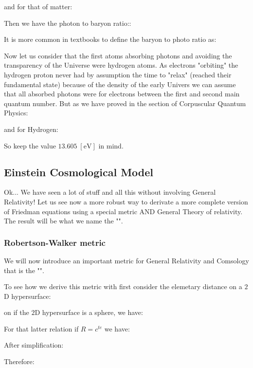 	and for that of matter:
	
	Then we have the photon to baryon ratio::
	
	\begin{tcolorbox}[title=Remark,colframe=black,arc=10pt]
	It is more common in textbooks to define the baryon to photo ratio as:
	
	\end{tcolorbox}
	Now let us consider that the first atoms absorbing photons and avoiding the transparency of the Universe were hydrogen atoms. As electrons "orbiting" the hydrogen proton never had by assumption the time to "relax" (reached their fundamental state) because of the density of the early Univers we can assume that all absorbed photons were for electrons between the first and second main quantum number. But as we have proved in the section of Corpuscular Quantum Physics:
	
	and for Hydrogen:
	
	So keep the value $13.605\;[\text{eV}]$ in mind.
	
	\subsection{Einstein Cosmological Model}
	Ok... We have seen a lot of stuff and all this without involving General Relativity! Let us see now a more robust way to derivate a more complete version of Friedman equations using a special metric AND General Theory of relativity. The result will be what we name the "".
	
	\subsubsection{Robertson-Walker metric}
	We will now introduce an important metric for General Relativity and Comsology that is the "".
	
	To see how we derive this metric with first consider the elemetary distance on a $2$D hypersurface:
	
	on if the $2$D hypersurface is a sphere, we have:
	
	For that latter relation if $R=c^{te}$ we have:
	
	After simplification:
	
	Therefore:
	
